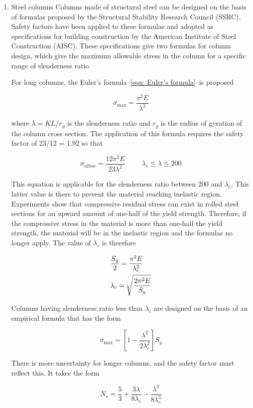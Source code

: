 \documentclass[a4paper,openany,12pt]{book}
\begin{document}
{{\begin{enumerate}
\item Steel columns
\label{steel-columns}
Columns made of structural steel can be designed on the basis of
formulas proposed by the Structural Stability Research Council (SSRC).
Safety factors have been applied to these formulas and adopted as
specifications for building construction by the American Institute of
Steel Construction (AISC). These specifications give two formulas for
column design, which give the maximum allowable stress in the column for
a specific range of slenderness ratio.

For long columns, the Euler's
formula--\ref{eqn: Euler's formula}--is proposed

$$\sigma_{\max} = \frac{\pi^2E}{\lambda^2}$$

where \(\lambda = KL/r_g\) is the slenderness ratio and \(r_g\) is the
radius of gyration of the column cross section. The application of this
formula requires the safety factor of 23/12 = 1.92 so that

$$\sigma_{allow} = \frac{12\pi^2E}{23\lambda^2} \hspace{1cm} \lambda_c \leqslant \lambda \leqslant 200$$

This equation is applicable for the slenderness ratio between 200 and
\(\lambda_c\). This latter value is there to prevent the material reaching
inelastic region. Experiments show that compressive residual stress can
exist in rolled steel sections for an upward amount of one-half of the
yield strength. Therefore, if the compressive stress in the material is
more than one-half the yield strength, the material will be in the
inelastic region and the formulas no longer apply. The value of
\(\lambda_c\) is therefore

$$\begin{gathered}
  \frac{S_y}{2} = \frac{\pi ^2E}{\lambda_c^2} \hfill \\
  \lambda_c = \sqrt {\frac{2\pi^2E}{S_y}}  \hfill \end{gathered}$$

Columns having slenderness ratio less than \(\lambda_c\) are designed on
the basis of an empirical formula that has the form

$$\sigma _{\max} = \left[ 1 - \frac{\lambda^2}{2\lambda_c^2} \right]S_y$$

There is more uncertainty for longer columns, and the safety factor must
reflect this. It takes the form

$$N_s = \frac{5}{3} + \frac{3\lambda}{8\lambda_c} - \frac{\lambda^3}{8\lambda_c^3}$$


\end{enumerate}}}
\end{document}
